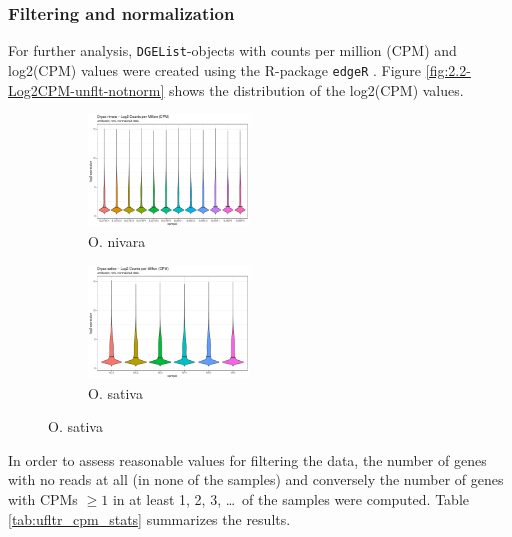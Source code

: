 \subsubsection{Filtering and normalization}

For further analysis, \verb|DGEList|-objects with counts per million (CPM) and log2(CPM) values were created using the R-package \verb|edgeR| \autocite{R-edgeR, edgeR2010}. Figure \ref{fig:2.2-Log2CPM-unflt-notnorm} shows the distribution of the log2(CPM) values.

\begin{figure}[htbp]
    \caption{Log2(CPM) distribution of the unfiltered, non-normalized data}
    \label{fig:2.2-Log2CPM-unflt-notnorm}
    \begin{subfigure}[t]{0.64\linewidth}
        \caption{O. nivara}
        \label{fig:2.2-Log2CPM-unflt-notnorm-Oryza_nivara}
        \includegraphics[width=\textwidth, height=3cm]{../../results/plots-and-tables/2.2-Log2CPM-unflt-notnorm-Oryza_nivara}
    \end{subfigure}
    \begin{subfigure}[t]{0.32\linewidth}
        \caption{O. sativa}
        \label{fig:2.2-Log2CPM-unflt-notnorm-Oryza_sativa}
        \includegraphics[width=\textwidth, height=3cm]{../../results/plots-and-tables/2.2-Log2CPM-unflt-notnorm-Oryza_sativa}
    \end{subfigure}
\end{figure}

In order to assess reasonable values for filtering the data, the number of genes with no reads at all (in none of the samples) and conversely the number of genes with CPMs \(\ge 1\) in at least 1, 2, 3, \dots\ of the samples were computed. Table \ref{tab:ufltr_cpm_stats} summarizes the results.

